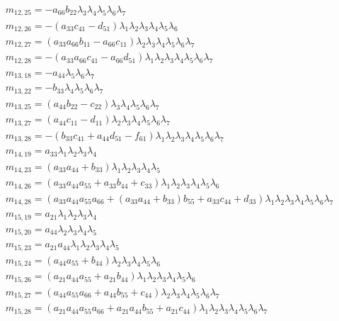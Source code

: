 \documentclass{article}
\begin{document}
\begin{align*}
&m_{12,25}=-a_{66} b_{22} \lambda_{3} \lambda_{4} \lambda_{5} \lambda_{6} \lambda_{7}\\
&m_{12,26}=-{\left(a_{33} c_{41} - d_{51}\right)} \lambda_{1} \lambda_{2} \lambda_{3} \lambda_{4} \lambda_{5} \lambda_{6}\\
&m_{12,27}={\left(a_{33} a_{66} b_{11} - a_{66} c_{11}\right)} \lambda_{2} \lambda_{3} \lambda_{4} \lambda_{5} \lambda_{6} \lambda_{7}\\
&m_{12,28}=-{\left(a_{33} a_{66} c_{41} - a_{66} d_{51}\right)} \lambda_{1} \lambda_{2} \lambda_{3} \lambda_{4} \lambda_{5} \lambda_{6} \lambda_{7}\\
&m_{13,18}=-a_{44} \lambda_{5} \lambda_{6} \lambda_{7}\\
&m_{13,22}=-b_{33} \lambda_{4} \lambda_{5} \lambda_{6} \lambda_{7}\\
&m_{13,25}={\left(a_{44} b_{22} - c_{22}\right)} \lambda_{3} \lambda_{4} \lambda_{5} \lambda_{6} \lambda_{7}\\
&m_{13,27}={\left(a_{44} c_{11} - d_{11}\right)} \lambda_{2} \lambda_{3} \lambda_{4} \lambda_{5} \lambda_{6} \lambda_{7}\\
&m_{13,28}=-{\left(b_{33} c_{41} + a_{44} d_{51} - f_{61}\right)} \lambda_{1} \lambda_{2} \lambda_{3} \lambda_{4} \lambda_{5} \lambda_{6} \lambda_{7}\\
&m_{14,19}=a_{33} \lambda_{1} \lambda_{2} \lambda_{3} \lambda_{4}\\
&m_{14,23}={\left(a_{33} a_{44} + b_{33}\right)} \lambda_{1} \lambda_{2} \lambda_{3} \lambda_{4} \lambda_{5}\\
&m_{14,26}={\left(a_{33} a_{44} a_{55} + a_{33} b_{44} + c_{33}\right)} \lambda_{1} \lambda_{2} \lambda_{3} \lambda_{4} \lambda_{5} \lambda_{6}\\
&m_{14,28}={\left(a_{33} a_{44} a_{55} a_{66} + {\left(a_{33} a_{44} + b_{33}\right)} b_{55} + a_{33} c_{44} + d_{33}\right)} \lambda_{1} \lambda_{2} \lambda_{3} \lambda_{4} \lambda_{5} \lambda_{6} \lambda_{7}\\
&m_{15,19}=a_{21} \lambda_{1} \lambda_{2} \lambda_{3} \lambda_{4}\\
&m_{15,20}=a_{44} \lambda_{2} \lambda_{3} \lambda_{4} \lambda_{5}\\
&m_{15,23}=a_{21} a_{44} \lambda_{1} \lambda_{2} \lambda_{3} \lambda_{4} \lambda_{5}\\
&m_{15,24}={\left(a_{44} a_{55} + b_{44}\right)} \lambda_{2} \lambda_{3} \lambda_{4} \lambda_{5} \lambda_{6}\\
&m_{15,26}={\left(a_{21} a_{44} a_{55} + a_{21} b_{44}\right)} \lambda_{1} \lambda_{2} \lambda_{3} \lambda_{4} \lambda_{5} \lambda_{6}\\
&m_{15,27}={\left(a_{44} a_{55} a_{66} + a_{44} b_{55} + c_{44}\right)} \lambda_{2} \lambda_{3} \lambda_{4} \lambda_{5} \lambda_{6} \lambda_{7}\\
&m_{15,28}={\left(a_{21} a_{44} a_{55} a_{66} + a_{21} a_{44} b_{55} + a_{21} c_{44}\right)} \lambda_{1} \lambda_{2} \lambda_{3} \lambda_{4} \lambda_{5} \lambda_{6} \lambda_{7}\\
\end{align*}
\end{document}
